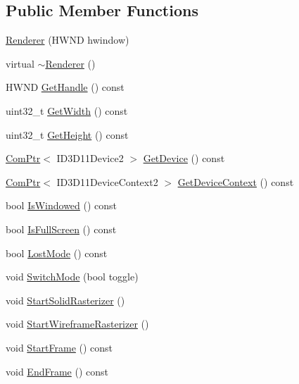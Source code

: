 \subsection*{Public Member Functions}
\begin{DoxyCompactItemize}
\item 
\hyperlink{classmage_1_1_renderer_a762dcda433c319af237d1dfd9bc6095f}{Renderer} (H\+W\+ND hwindow)
\item 
virtual \hyperlink{classmage_1_1_renderer_a997e041f28cc71d069d1ab7d29fe6ced}{$\sim$\+Renderer} ()
\item 
H\+W\+ND \hyperlink{classmage_1_1_renderer_a11d47495a47c58a0f67aae3110f9f519}{Get\+Handle} () const
\item 
uint32\+\_\+t \hyperlink{classmage_1_1_renderer_a65e448e5fa4e8b6be0371ff00b97912a}{Get\+Width} () const
\item 
uint32\+\_\+t \hyperlink{classmage_1_1_renderer_a40c90d8878416dd03b7fdef0b3de29a8}{Get\+Height} () const
\item 
\hyperlink{namespacemage_ae74f374780900893caa5555d1031fd79}{Com\+Ptr}$<$ I\+D3\+D11\+Device2 $>$ \hyperlink{classmage_1_1_renderer_a1843c9f9f24174ea48da8ae28537292b}{Get\+Device} () const
\item 
\hyperlink{namespacemage_ae74f374780900893caa5555d1031fd79}{Com\+Ptr}$<$ I\+D3\+D11\+Device\+Context2 $>$ \hyperlink{classmage_1_1_renderer_a764ee3d8f3dea6aceb05f42bce80b147}{Get\+Device\+Context} () const
\item 
bool \hyperlink{classmage_1_1_renderer_a1de1804c1eedae7dc12435a520a10b9c}{Is\+Windowed} () const
\item 
bool \hyperlink{classmage_1_1_renderer_a5ae3220e19c68f47a8e4d55e3ced4694}{Is\+Full\+Screen} () const
\item 
bool \hyperlink{classmage_1_1_renderer_afdde83a1e2bc9288f000fb2575c525d0}{Lost\+Mode} () const
\item 
void \hyperlink{classmage_1_1_renderer_a9004ab608659188900c808eacb5f873c}{Switch\+Mode} (bool toggle)
\item 
void \hyperlink{classmage_1_1_renderer_a921f7e037ce57927cef9512582e9e0fe}{Start\+Solid\+Rasterizer} ()
\item 
void \hyperlink{classmage_1_1_renderer_a479f89bf1770828ffcb2395a1f467ed4}{Start\+Wireframe\+Rasterizer} ()
\item 
void \hyperlink{classmage_1_1_renderer_a5fea21434ad2ac5bcd9ca09cf5f41852}{Start\+Frame} () const
\item 
void \hyperlink{classmage_1_1_renderer_a4932c51d0f6e56269712024d2d0322ef}{End\+Frame} () const
\end{DoxyCompactItemize}
